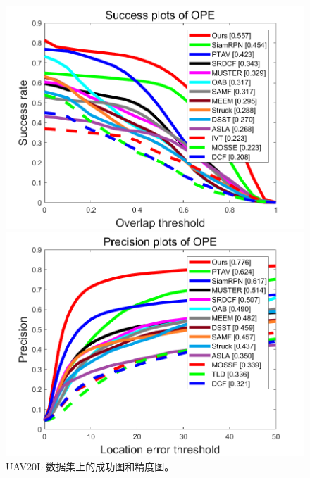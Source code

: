 \begin{figure}[t]
\begin{minipage}{0.48\linewidth}
  \centering
  \centerline{\includegraphics[width=1.0\textwidth]{Img/globally/UAV20L/quality_plot_overlap_OPE_AUC.png}}
\end{minipage}
\hfill
\begin{minipage}{0.48\linewidth}
  \centering
  \centerline{\includegraphics[width=1.0\textwidth]{Img/globally/UAV20L/quality_plot_error_OPE_threshold.png}}
\end{minipage}
\caption{UAV20L 数据集上的成功图和精度图。}
\label{fig:globally_uav20l}
\end{figure}


